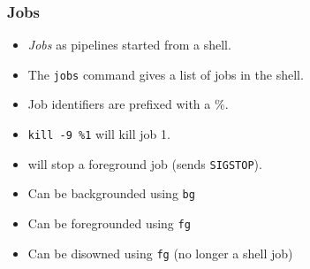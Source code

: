 \subsubsection{Jobs}
\begin{itemize}
  \item \emph{Jobs} as pipelines started from a shell.
  \item The \texttt{jobs} command gives a list of jobs in the shell.
  \item Job identifiers are prefixed with a \%.
  \item \texttt{kill -9 \%1} will kill job 1.
  \item \keys{\ctrl}  will stop a foreground job (sends \texttt{SIGSTOP}).
  \item Can be backgrounded using \texttt{bg}
  \item Can be foregrounded using \texttt{fg}
  \item Can be disowned using \texttt{fg} (no longer a shell job)
\end{itemize}
